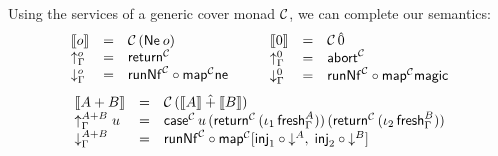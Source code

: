 \documentclass[a4paper,USenglish,cleveref, autoref]{lipics-v2019}
\begin{document}

Using the services of a generic cover monad $\C$, we can complete our semantics:
\[
\begin{array}{lcl}
  \den   \tybase & = & \C\,(\tNe\,\tybase) \\
  \upG   \tybase & = & \treturn[\C] \\
  \downG \tybase & = & \trunNf[\C] \comp \tmap[\C]\tne \\
\end{array}
\qquad
\begin{array}{lcl}
  \den   \tyzero & = & \C\,\hat0 \\
  \upG   \tyzero & = & \tabort^\C \\
  \downG \tyzero & = & \trunNf[\C] \comp \tmap[\C]\tmagic \\
\end{array}
\]
\[
\begin{array}{lcl}
  \den {A+B} & = & \C\,(\den A \hatplus \den B) \\
  \upG {A+B} \; u & = & \tcase^\C\,u
    \,(\treturn[\C]\,(\iota_1\,\tfresh^A_\Gamma))
    \,(\treturn[\C]\,(\iota_2\,\tfresh^B_\Gamma))
    \\
  \downG {A+B} & = & \trunNf[\C] \comp
    \tmap[\C] [\tinj_1 \comp \down A,\; \tinj_2 \comp \down B] \\
\end{array}
\]
\end{document}
